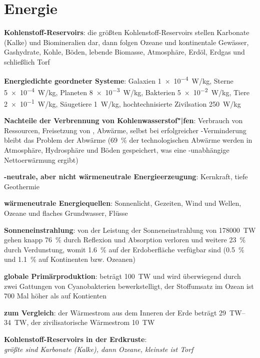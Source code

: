 \pagebreak

\section{%
    Energie%
}

\textbf{Kohlenstoff-Reservoirs}:
die größten Kohlenstoff-Reservoirs stellen Karbonate (Kalke) und Biomineralien dar,
dann folgen Ozeane und kontinentale Gewässer,
Gashydrate,
Kohle,
Böden,
lebende Biomasse,
Atmosphäre,
Erdöl,
Erdgas und
schließlich Torf

\textbf{Energiedichte geordneter Systeme}:
Galaxien \SI{1e-4}{\watt/\kilogram},
Sterne \SI{5e-4}{\watt/\kilogram},
Planeten \SI{8e-3}{\watt/\kilogram},
Bakterien \SI{5e-2}{\watt/\kilogram},
Tiere \SI{2e-1}{\watt/\kilogram},
Säugetiere \SI{1}{\watt/\kilogram},
hochtechnisierte Zivilsation \SI{250}{\watt/\kilogram}

\textbf{Nachteile der Verbrennung von Kohlenwasserstof"|fen}:
Verbrauch von Ressourcen,
Freisetzung von ,
Abwärme,
selbst bei erfolgreicher -Verminderung bleibt das Problem der Abwärme
(\SI{69}{\percent} der technologischen Abwärme werden in Atmosphäre, Hydrosphäre und Böden
gespeichert, was eine -unabhängige Nettoerwärmung ergibt)

\textbf{-neutrale, aber nicht wärmeneutrale Energieerzeugung}:
Kernkraft,
tiefe Geothermie

\textbf{wärmeneutrale Energiequellen}:
Sonnenlicht,
Gezeiten,
Wind und Wellen,
Ozeane und flaches Grundwasser,
Flüsse

\textbf{Sonneneinstrahlung}:
von der Leistung der Sonneneinstrahlung von \SI{178000}{\tera\watt}
gehen knapp \SI{76}{\percent} durch Reflexion und Absorption verloren
und weitere \SI{23}{\percent} durch Verdunstung,
womit \SI{1.6}{\percent} auf der Erdoberfläche verfügbar sind
(\SI{0.5}{\percent} und \SI{1.1}{\percent} auf Kontinenten bzw. Ozeanen)

\textbf{globale Primärproduktion}:
beträgt \SI{100}{\tera\watt} und wird überwiegend durch zwei Gattungen von Cyanobakterien
bewerkstelligt,
der Stoffumsatz im Ozean ist 700 Mal höher als auf Kontienten

\textbf{zum Vergleich}:
der Wärmestrom aus dem Inneren der Erde beträgt \SIrange{29}{34}{\tera\watt},
der zivilisatorische Wärmestrom \SI{10}{\tera\watt}

\begin{wichtig}
    \item
    \textbf{Kohlenstoff-Reservoirs in der Erdkruste}:\\
    \emph{größte sind Karbonate (Kalke), dann Ozeane, kleinste ist Torf}
\end{wichtig}

\pagebreak
